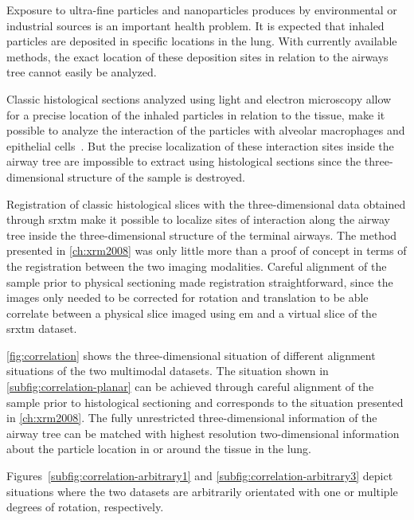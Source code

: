 Exposure to ultra-fine particles and nanoparticles produces by environmental or industrial sources is an important health problem. It is expected that inhaled particles are deposited in specific locations in the lung. With currently available methods, the exact location of these deposition sites in relation to the airways tree cannot easily be analyzed. 

Classic histological sections analyzed using light and electron microscopy allow for a precise location of the inhaled particles in relation to the tissue, \ie make it possible to analyze the interaction of the particles with alveolar macrophages and epithelial cells~\cite{Muhlfeld2008}. But the precise localization of these interaction sites inside the airway tree are impossible to extract using histological sections since the three-dimensional structure of the sample is destroyed.

Registration of classic histological slices with the three-dimensional data obtained through \ac{srxtm} make it possible to localize sites of interaction along the airway tree inside the three-dimensional structure of the terminal airways. The method presented in \autoref{ch:xrm2008} was only little more than a proof of concept in terms of the registration between the two imaging modalities. Careful alignment of the sample prior to physical sectioning made registration straightforward, since the images only needed to be corrected for rotation and translation to be able correlate between a physical slice imaged using \ac{em} and a virtual slice of the \ac{srxtm} dataset.

\autoref{fig:correlation} shows the three-dimensional situation of different alignment situations of the two multimodal datasets. The situation shown in \autoref{subfig:correlation-planar} can be achieved through careful alignment of the sample prior to histological sectioning and corresponds to the situation presented in \autoref{ch:xrm2008}. The fully unrestricted three-dimensional information of the airway tree can be matched with highest resolution two-dimensional information about the particle location in or around the tissue in the lung.

Figures~\ref{subfig:correlation-arbitrary1} and \ref{subfig:correlation-arbitrary3} depict situations where the two datasets are arbitrarily orientated with one or multiple degrees of rotation, respectively.

